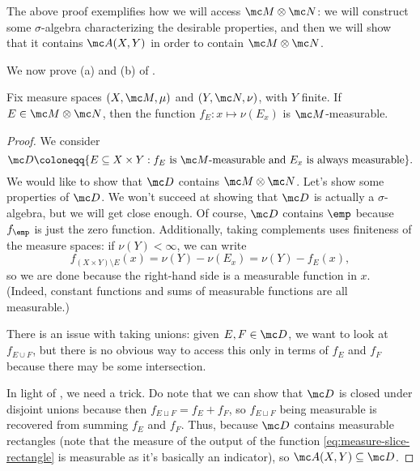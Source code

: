 \documentclass[../notes.tex]{subfiles}
\begin{document}
\begin{remark}
	The above proof exemplifies how we will access $\mc M\otimes\mc N$: we will construct some $\sigma$-algebra characterizing the desirable properties, and then we will show that it contains $\mc A(X,Y)$ in order to contain $\mc M\otimes\mc N$.
\end{remark}
We now prove (a) and (b) of .
\begin{lemma} \label{lem:slicing-is-measurable}
	Fix measure spaces $(X,\mc M,\mu)$ and $(Y,\mc N,\nu)$, with $Y$ finite. If $E\in\mc M\otimes\mc N$, then the function $f_E\colon x\mapsto\nu(E_x)$ is $\mc M$-measurable.
\end{lemma}
\begin{proof}
	We consider
	\[\mc D\coloneqq\{E\subseteq X\times Y:f_E\text{ is }\mc M\text{-measurable and }E_x\text{ is always measurable}\}.\]
	We would like to show that $\mc D$ contains $\mc M\otimes\mc N$. Let's show some properties of $\mc D$. We won't succeed at showing that $\mc D$ is actually a $\sigma$-algebra, but we will get close enough. Of course, $\mc D$ contains $\emp$ because $f_\emp$ is just the zero function. Additionally, taking complements uses finiteness of the measure spaces: if $\nu(Y)<\infty$, we can write
	\[f_{(X\times Y)\setminus E}(x)=\nu(Y)-\nu(E_x)=\nu(Y)-f_E(x),\]
	so we are done because the right-hand side is a measurable function in $x$. (Indeed, constant functions and sums of measurable functions are all measurable.)
	\begin{remark} \label{rem:attempt-measurable-slice-function}
		There is an issue with taking unions: given $E,F\in\mc D$, we want to look at $f_{E\cup F}$, but there is no obvious way to access this only in terms of $f_E$ and $f_F$ because there may be some intersection.
	\end{remark}
	In light of , we need a trick. Do note that we can show that $\mc D$ is closed under disjoint unions because then $f_{E\sqcup F}=f_E+f_F$, so $f_{E\sqcup F}$ being measurable is recovered from summing $f_E$ and $f_F$. Thus, because $\mc D$ contains measurable rectangles (note that the measure of the output of the function \eqref{eq:measure-slice-rectangle} is measurable as it's basically an indicator), so $\mc A(X,Y)\subseteq\mc D$.
	

\end{proof}
\end{document}
